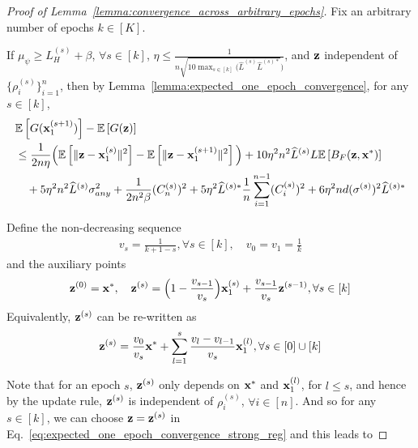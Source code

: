 \begin{proof}[Proof of Lemma~\ref{lemma:convergence_across_arbitrary_epochs}]
    Fix an arbitrary number of epochs $k\in [K]$.
    
    If $\mu_\psi \geq L_H^{(s)} + \beta$, 
    $\forall s\in [k]$, $\eta \leq \frac{1}{n\sqrt{10 \max_{s\in [k]} (\widehat{L}^{(s)} \widehat{L}^{(s)*}})}$, and ${\mathbf{z}}$ independent of $\{\rho_i^{(s)}\}_{i=1}^{n}$,
    then by Lemma~\ref{lemma:expected_one_epoch_convergence}, for any $s\in [k]$,
    \begin{align}
    \label{eq:expected_one_epoch_convergence_strong_reg}
    &\mathbb{E}\left[G({\mathbf{x}}_1^{(s+1)})\right] - \mathbb{E}\left[G({\mathbf{z}})\right]\\
        \nonumber
        &\leq  \frac{1}{2 n \eta}\Big( \mathbb{E}\left[\|{\mathbf{z}} - {\mathbf{x}}_1^{(s)}\|^2\right]  - \mathbb{E}\left[ \|{\mathbf{z}} - {\mathbf{x}}_1^{(s+1)}\|^2 \right] \Big)
        + 10\eta^2 n^2 \widehat{L}^{(s)} L \mathbb{E}\left[  B_F({\mathbf{z}}, {\mathbf{x}}^*)\right]\\
        \nonumber
        &\quad + 5 \eta^2 n^2 \widehat{L}^{(s)}\sigma_{any}^2
        + \frac{1}{2n^2 \beta}(C_n^{(s)})^2 
         +  5\eta^2 \widehat{L}^{(s)*} \frac{1}{n} \sum_{i=1}^{n-1}(C_i^{(s)})^2
         + 6 \eta^2 nd (\sigma^{(s)})^2 \widehat{L}^{(s)*}
    \end{align}

    Define the non-decreasing sequence
    \begin{align*}
        v_s = \frac{1}{k+1-s}, \forall s\in [k], \quad v_0 = v_1 = \frac{1}{k}
    \end{align*}
    and the auxiliary points
    \begin{align}
    \label{eq:z_def}
        {\mathbf{z}}^{(0)} = {\mathbf{x}}^*, \quad {\mathbf{z}}^{(s)} = \Big( 1- \frac{v_{s-1}}{v_s}\Big) {\mathbf{x}}_1^{(s)} + \frac{v_{s-1}}{v_s} {\mathbf{z}}^{(s-1)}, \forall s\in [k]
    \end{align}
    Equivalently, ${\mathbf{z}}^{(s)}$ can be re-written as
    \begin{align}
    \label{eq:z_eq_form}
        {\mathbf{z}}^{(s)} = \frac{v_0}{v_s}{\mathbf{x}}^* + \sum_{l=1}^{s} \frac{v_l - v_{l-1}}{v_s} {\mathbf{x}}_1^{(l)}, \forall s\in [0]\cup [k]
    \end{align}
    
    Note that for an epoch $s$, ${\mathbf{z}}^{(s)}$ only depends on ${\mathbf{x}}^*$ and ${\mathbf{x}}_1^{(l)}$, for $l \leq s$, and hence by the update rule, ${\mathbf{z}}^{(s)}$ is independent of $\rho_i^{(s)}$, $\forall i\in [n]$.
    And so for any $s\in [k]$, we can choose ${\mathbf{z}} = {\mathbf{z}}^{(s)}$ in Eq.~\ref{eq:expected_one_epoch_convergence_strong_reg} and this leads to


\end{proof}
